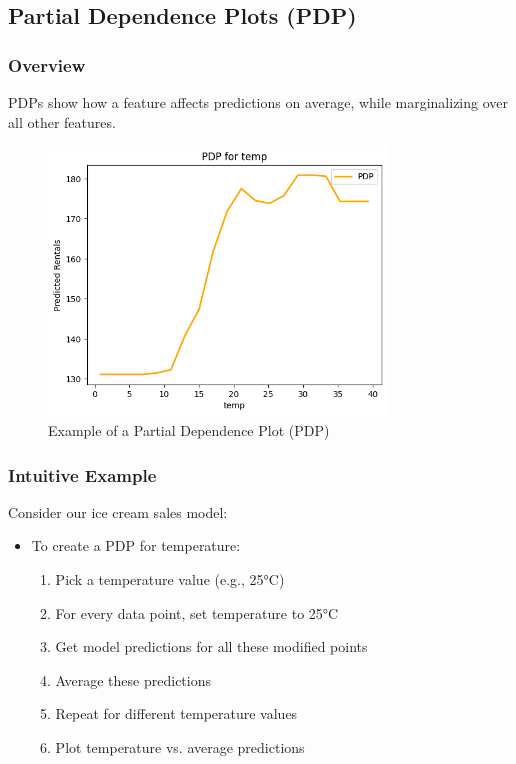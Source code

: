 \documentclass{article}
\begin{document}
\subsection{Partial Dependence Plots (PDP)}

\subsubsection{Overview}
PDPs show how a feature affects predictions on average, while marginalizing over all other features.

\begin{figure}[h]
    \centering
    \includegraphics[width=0.8\textwidth]{images/pdp.png}
    \caption{Example of a Partial Dependence Plot (PDP)}
    \label{fig:pdp}
\end{figure}

\subsubsection{Intuitive Example}
Consider our ice cream sales model:
\begin{itemize}
    \item To create a PDP for temperature:
    \begin{enumerate}
        \item Pick a temperature value (e.g., 25°C)
        \item For every data point, set temperature to 25°C
        \item Get model predictions for all these modified points
        \item Average these predictions
        \item Repeat for different temperature values
        \item Plot temperature vs. average predictions
    \end{enumerate}
\end{itemize}
\end{document}
